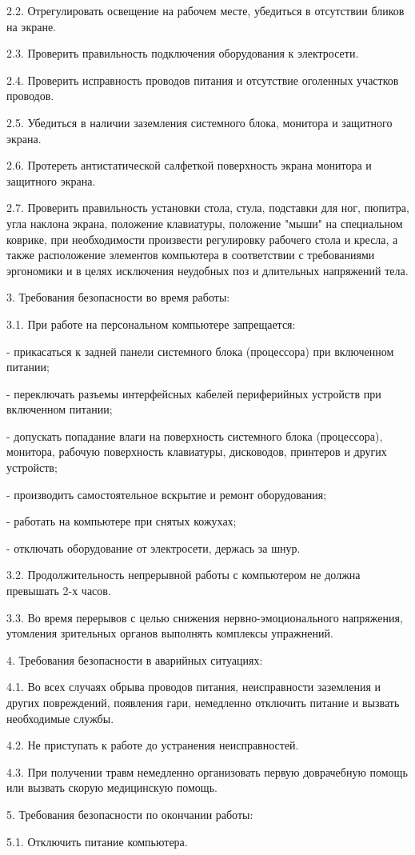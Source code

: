 \documentclass[a4paper,14pt]{extarticle}
\begin{document}
2.2. Отрегулировать освещение на рабочем месте, убедиться в отсутствии бликов на экране.

2.3. Проверить правильность подключения оборудования к электросети.

2.4. Проверить исправность проводов питания и отсутствие оголенных участков проводов.

2.5. Убедиться в наличии заземления системного блока, монитора и защитного экрана.

2.6. Протереть антистатической салфеткой поверхность экрана монитора и защитного экрана.

2.7. Проверить правильность установки стола, стула, подставки для ног, пюпитра, угла наклона экрана, положение клавиатуры, положение "мыши" на специальном коврике, при необходимости произвести регулировку рабочего стола и кресла, а также расположение элементов компьютера в соответствии с требованиями эргономики и в целях исключения неудобных поз и длительных напряжений тела.

3. Требования безопасности во время работы:

3.1. При работе на персональном компьютере запрещается:

- прикасаться к задней панели системного блока (процессора) при включенном питании;

- переключать разъемы интерфейсных кабелей периферийных устройств при включенном питании;

- допускать попадание влаги на поверхность системного блока (процессора), монитора, рабочую поверхность клавиатуры, дисководов, принтеров и других устройств;

- производить самостоятельное вскрытие и ремонт оборудования;

- работать на компьютере при снятых кожухах;

- отключать оборудование от электросети, держась за шнур.

3.2. Продолжительность непрерывной работы с компьютером не должна превышать 2-х часов.

3.3. Во время перерывов с целью снижения нервно-эмоционального напряжения, утомления зрительных органов выполнять комплексы упражнений.

4. Требования безопасности в аварийных ситуациях:

4.1. Во всех случаях обрыва проводов питания, неисправности заземления и других повреждений, появления гари, немедленно отключить питание и вызвать необходимые службы.

4.2. Не приступать к работе до устранения неисправностей.

4.3. При получении травм немедленно организовать первую доврачебную помощь или вызвать скорую медицинскую помощь.

5. Требования безопасности по окончании работы:

5.1. Отключить питание компьютера.
\end{document}
